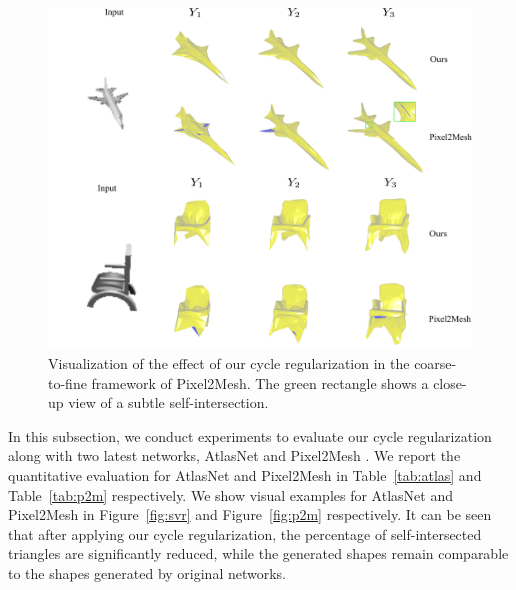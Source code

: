 \begin{figure}
	\centering
	\includegraphics[width=\textwidth]{img/p2m/3level}
	\caption{Visualization of the effect of our cycle regularization in the coarse-to-fine framework of Pixel2Mesh. The green rectangle shows a close-up view of a subtle self-intersection.}
	\label{fig:3level}
\end{figure}
In this subsection, we conduct experiments to evaluate our cycle regularization along with two latest networks, AtlasNet \cite{atlasnet} and Pixel2Mesh \cite{pixel2mesh}. We report the quantitative evaluation for AtlasNet and Pixel2Mesh in Table~\ref{tab:atlas} and Table~\ref{tab:p2m} respectively. We show visual examples for AtlasNet and Pixel2Mesh in Figure~\ref{fig:svr} and Figure~\ref{fig:p2m} respectively. It can be seen that after applying our cycle regularization, the percentage of self-intersected triangles are significantly reduced, while the generated shapes remain comparable to the shapes generated by original networks.

